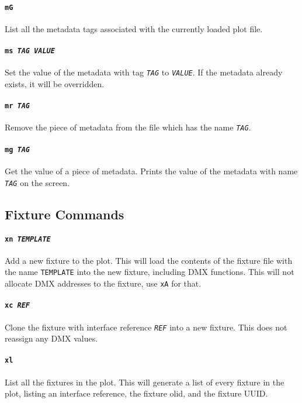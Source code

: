 \documentclass[a4paper]{article}
\begin{document}
\paragraph{\texttt{mG}}
List all the metadata tags associated with the currently loaded plot file.

\paragraph{\texttt{ms \textit{TAG VALUE}}}
Set the value of the metadata with tag \texttt{\textit{TAG}} to 
\texttt{\textit{VALUE}}. If the metadata already exists, it will be 
overridden.

\paragraph{\texttt{mr \textit{TAG}}}
Remove the piece of metadata from the file which has the name 
\texttt{\textit{TAG}}.

\paragraph{\texttt{mg \textit{TAG}}}
Get the value of a piece of metadata. Prints the value of the metadata with
name \texttt{\textit{TAG}} on the screen.

\subsection{Fixture Commands}

\paragraph{\texttt{xn \textit{TEMPLATE}}}
Add a new fixture to the plot. This will load the contents of the fixture 
file with the name \texttt{TEMPLATE} into the new fixture, including DMX 
functions. This will not allocate DMX addresses to the fixture, use 
\texttt{xA} for that.

\paragraph{\texttt{xc \textit{REF}}}
Clone the fixture with interface reference \texttt{\textit{REF}} into a new 
fixture. This does not reassign any DMX values.

\paragraph{\texttt{xl}}
List all the fixtures in the plot. This will generate a list of every fixture 
in the plot, listing an interface reference, the fixture olid, and the fixture 
UUID.
\end{document}
